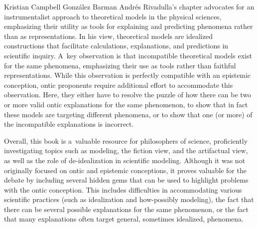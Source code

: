 \begin{recengenv}{Kristian Campbell González Barman}
Andrés Rivadulla's chapter advocates for an instrumentalist approach to theoretical models in the physical sciences, emphasizing their utility as tools for explaining and predicting phenomena rather than as representations. In his view, theoretical models are idealized constructions that facilitate calculations, explanations, and predictions in scientific inquiry. A~key observation is that incompatible theoretical models exist for the same phenomena, emphasizing their use as tools rather than faithful representations. While this observation is perfectly compatible with an epistemic conception, ontic proponents require additional effort to accommodate this observation. Here, they either have to resolve the puzzle of how there can be two or more valid ontic explanations for the same phenomenon, to show that in fact these models are targeting different phenomena, or to show that one (or more) of the incompatible explanations is incorrect.

Overall, this book is a~valuable resource for philosophers of science, proficiently investigating topics such as modeling, the fiction view, and the artifactual view, as well as the role of de-idealization in scientific modeling. Although it was not originally focused on ontic and epistemic conceptions, it proves valuable for the debate by including several hidden gems that can be used to highlight problems with the ontic conception. This includes difficulties in accommodating various scientific practices (such as idealization and how-possibly modeling), the fact that there can be several possible explanations for the same phenomenon, or the fact that many explanations often target general, sometimes idealized, phenomena.




\end{recengenv}
